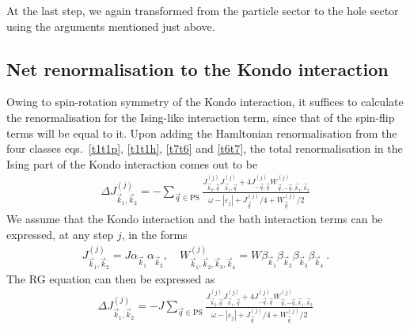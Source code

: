 \documentclass{revtex4-2}
\begin{document}
At the last step, we again transformed from the particle sector to the hole sector using the arguments mentioned just above.

\subsection{Net renormalisation to the Kondo interaction}
Owing to spin-rotation symmetry of the Kondo interaction, it suffices to calculate the renormalisation for the Ising-like interaction term, since that of the spin-flip terms will be equal to it. Upon adding the Hamltonian renormalisation from the four classes eqs.~\ref{t1t1p}, \ref{t1t1h}, \ref{t7t6} and \ref{t6t7}, the total renormalisation in the Ising part of the Kondo interaction comes out to be
\begin{equation}\begin{aligned}
	\Delta J^{(j)}_{\vec k_1, \vec k_2} = -\sum_{\vec q \in \text{PS}} \frac{J^{(j)}_{\vec k_2,\vec q} J^{(j)}_{\vec k_1,\vec q} + 4J^{(j)}_{-\vec q,\vec q} W^{(j)}_{\vec q,-\vec q,\vec k_1, \vec k_2}}{\omega - |\varepsilon_j| + J^{(j)}_{\vec q}/4 + W^{(j)}_{\vec q}/2}
\end{aligned}\end{equation}
We assume that the Kondo interaction and the bath interaction terms can be expressed, at any step \(j\), in the forms 
\begin{equation}\begin{aligned}
J^{(j)}_{\vec k_1, \vec k_2} = J \alpha_{\vec k_1}\alpha_{\vec k_2},\quad
W^{(j)}_{\vec k_1, \vec k_2, \vec k_3, \vec k_4} = W \beta_{\vec k_1}\beta_{\vec k_2}\beta_{\vec k_3}\beta_{\vec k_4}~.
\end{aligned}\end{equation}
The RG equation can then be expressed as
\begin{equation}\begin{aligned}
	\Delta J^{(j)}_{\vec k_1, \vec k_2} = -J \sum_{\vec q \in \text{PS}} \frac{J^{(j)}_{\vec k_2,\vec q} J^{(j)}_{\vec k_1,\vec q} + 4J^{(j)}_{-\vec q,\vec q} W^{(j)}_{\vec q,-\vec q,\vec k_1, \vec k_2}}{\omega - |\varepsilon_j| + J^{(j)}_{\vec q}/4 + W^{(j)}_{\vec q}/2}
\end{aligned}\end{equation}
\end{document}
